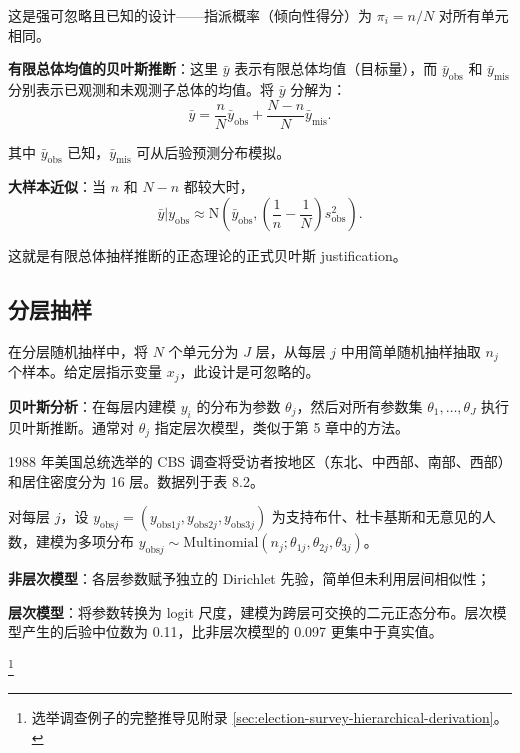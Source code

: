 这是强可忽略且已知的设计——指派概率（倾向性得分）为 $\pi_i = n/N$ 对所有单元相同。

\textbf{有限总体均值的贝叶斯推断}：这里 $\bar{y}$ 表示有限总体均值（目标量），而 $\bar{y}_{\mathrm{obs}}$ 和 $\bar{y}_{\mathrm{mis}}$ 分别表示已观测和未观测子总体的均值。将 $\bar{y}$ 分解为：
\begin{equation}
\bar{y} = \frac{n}{N}\bar{y}_{\mathrm{obs}} + \frac{N-n}{N}\bar{y}_{\mathrm{mis}}. \label{eq:ch8-finite-pop-mean}
\end{equation}

其中 $\bar{y}_{\mathrm{obs}}$ 已知，$\bar{y}_{\mathrm{mis}}$ 可从后验预测分布模拟。

\textbf{大样本近似}：当 $n$ 和 $N-n$ 都较大时，
\begin{equation}
\bar{y} | y_{\mathrm{obs}} \approx \mathrm{N}\left(\bar{y}_{\mathrm{obs}}, \left(\frac{1}{n} - \frac{1}{N}\right)s_{\mathrm{obs}}^2\right). \label{eq:ch8-normal-approx-finite-pop}
\end{equation}

这就是有限总体抽样推断的正态理论的正式贝叶斯 justification。

\subsection{分层抽样}

在分层随机抽样中，将 $N$ 个单元分为 $J$ 层，从每层 $j$ 中用简单随机抽样抽取 $n_j$ 个样本。给定层指示变量 $x_j$，此设计是可忽略的。

\textbf{贝叶斯分析}：在每层内建模 $y_i$ 的分布为参数 $\theta_j$，然后对所有参数集 $\theta_1, \ldots, \theta_J$ 执行贝叶斯推断。通常对 $\theta_j$ 指定层次模型，类似于第 5 章中的方法。

\begin{Example}[选前民意调查的分层抽样分析]
  1988 年美国总统选举的 CBS 调查将受访者按地区（东北、中西部、南部、西部）和居住密度分为 16 层。数据列于表 8.2。

  对每层 $j$，设 $y_{\mathrm{obs}j} = (y_{\mathrm{obs}1j}, y_{\mathrm{obs}2j}, y_{\mathrm{obs}3j})$ 为支持布什、杜卡基斯和无意见的人数，建模为多项分布 $y_{\mathrm{obs}j} \sim \mathrm{Multinomial}(n_j; \theta_{1j}, \theta_{2j}, \theta_{3j})$。

  \textbf{非层次模型}：各层参数赋予独立的 Dirichlet 先验，简单但未利用层间相似性；

  \textbf{层次模型}：将参数转换为 logit 尺度，建模为跨层可交换的二元正态分布。层次模型产生的后验中位数为 0.11，比非层次模型的 0.097 更集中于真实值。
\end{Example}\footnote{选举调查例子的完整推导见附录 \cref{sec:election-survey-hierarchical-derivation}。}

